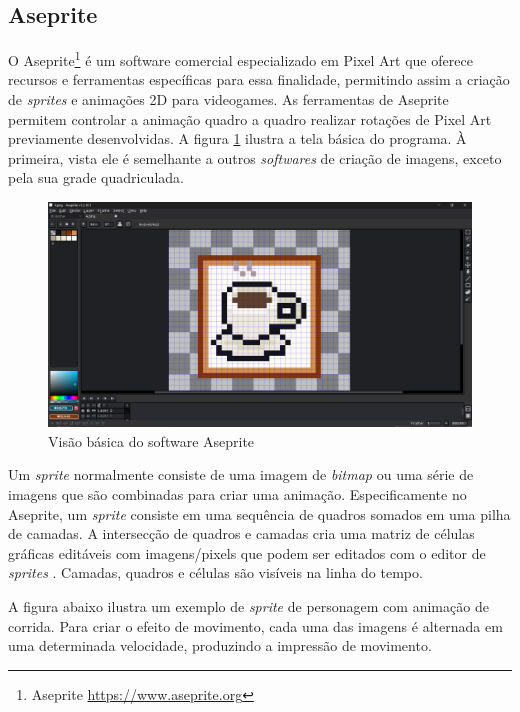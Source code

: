 \subsection{Aseprite}  
\label{sec:aseprite}
O Aseprite\footnote{Aseprite \url{https://www.aseprite.org}} é um software comercial especializado em Pixel Art que oferece recursos e ferramentas específicas para essa finalidade, permitindo assim a criação de \textit{sprites} e animações 2D para videogames. As ferramentas de Aseprite permitem controlar a animação quadro a quadro realizar rotações de Pixel Art previamente desenvolvidas.
A figura \ref{fig:aseprite} ilustra a tela básica do programa. À primeira, vista ele é semelhante a outros \textit{softwares} de criação de imagens, exceto pela sua grade quadriculada.  
\begin{figure}[h!]
    \centering
    \includegraphics[width=1\linewidth]{figuras/aseprite.png}
    \caption{Visão básica do software Aseprite}
    \label{fig:aseprite}
\end{figure}

Um \textit{sprite} normalmente consiste de uma imagem de \textit{bitmap} ou uma série de imagens que são combinadas para criar uma animação. Especificamente no Aseprite, um \textit{sprite} consiste em uma sequência de quadros somados em uma pilha de camadas. A intersecção de quadros e camadas cria uma matriz de células gráficas editáveis com imagens/pixels que podem ser editados com o editor de \textit{sprites} . Camadas, quadros e células são visíveis na linha do tempo.

A figura abaixo ilustra um exemplo de \textit{sprite} de personagem com animação de corrida. Para criar o efeito de movimento, cada uma das imagens é alternada em uma determinada velocidade, produzindo a impressão de movimento.

